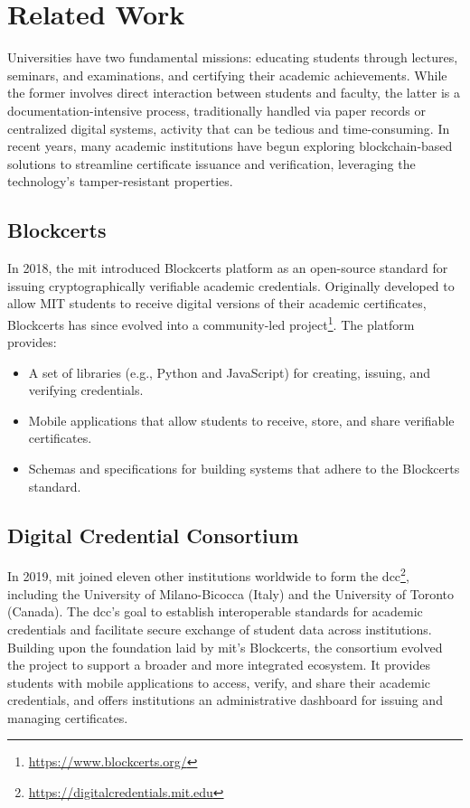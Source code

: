 \chapter{Related Work}
\label{chap:relatedWork}
Universities have two fundamental missions: educating students through lectures, seminars, and examinations, and certifying their academic achievements. While the former involves direct interaction between students and faculty, the latter is a documentation-intensive process, traditionally handled via paper records or centralized digital systems, activity that can be tedious and time-consuming. In recent years, many academic institutions have begun exploring blockchain-based solutions to streamline certificate issuance and verification, leveraging the technology’s tamper-resistant properties.

\section{Blockcerts}
In 2018, the \acrfull{mit} introduced Blockcerts platform  \cite{yassynzhanbolatzhan2021verificationuniversitystudent} as an open-source standard for issuing cryptographically verifiable academic credentials. Originally developed to allow MIT students to receive digital versions of their academic certificates, Blockcerts has since evolved into a community-led project\footnote{\url{https://www.blockcerts.org/}}. The platform provides:
\begin{itemize}
    \item A set of libraries (e.g., Python and JavaScript) for creating, issuing, and verifying credentials.
    \item Mobile applications that allow students to receive, store, and share verifiable certificates.
    \item Schemas and specifications for building systems that adhere to the Blockcerts standard.
\end{itemize}

\section{Digital Credential Consortium}
In 2019, \acrshort{mit}  joined eleven other institutions worldwide to form the \acrfull{dcc}\footnote{\url{https://digitalcredentials.mit.edu}},  including the University of Milano-Bicocca (Italy) and the University of Toronto (Canada). The \acrshort{dcc}'s goal to establish interoperable standards for academic credentials and facilitate secure exchange of student data across institutions. 
Building upon the foundation laid by \acrshort{mit}’s Blockcerts, the consortium evolved the project to support a broader and more integrated ecosystem. It provides students with mobile applications to access, verify, and share their academic credentials, and offers institutions an administrative dashboard for issuing and managing certificates.

